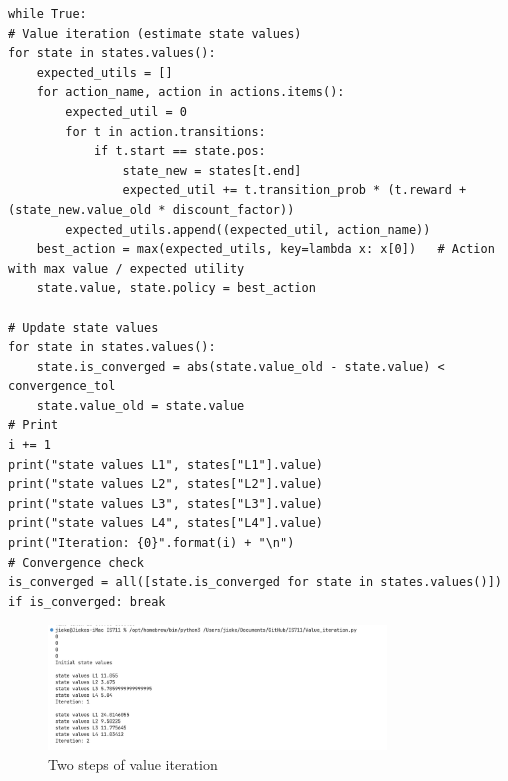 \documentclass[conference]{styles/acmsiggraph}
\begin{document}
\begin{minipage}{\textwidth}
\begin{lstlisting}[caption={Core Code of Value Iteration}, label={lst:q6}]
while True:
# Value iteration (estimate state values)
for state in states.values():
	expected_utils = []
	for action_name, action in actions.items():
		expected_util = 0
		for t in action.transitions:
			if t.start == state.pos:
				state_new = states[t.end]
				expected_util += t.transition_prob * (t.reward + (state_new.value_old * discount_factor))
		expected_utils.append((expected_util, action_name))
	best_action = max(expected_utils, key=lambda x: x[0])   # Action with max value / expected utility
	state.value, state.policy = best_action

# Update state values
for state in states.values():
	state.is_converged = abs(state.value_old - state.value) < convergence_tol
	state.value_old = state.value
# Print
i += 1
print("state values L1", states["L1"].value)
print("state values L2", states["L2"].value)
print("state values L3", states["L3"].value)
print("state values L4", states["L4"].value)
print("Iteration: {0}".format(i) + "\n")
# Convergence check
is_converged = all([state.is_converged for state in states.values()])
if is_converged: break
\end{lstlisting}
\end{minipage}

\begin{figure}[!h]
	\centering
	\includegraphics[width=0.8\textwidth]{figures/q6.png}
	\caption{Two steps of value iteration}
	\label{fig:q6}
\end{figure}
\end{document}
